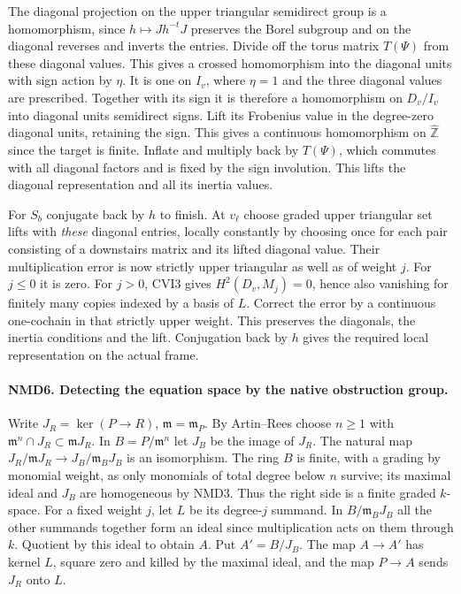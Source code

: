 The diagonal projection on the upper triangular semidirect group
is a homomorphism, since $h\mapsto Jh^{-t}J$ preserves the Borel
subgroup and on the diagonal reverses and inverts the entries.
Divide off the torus matrix $T(\Psi)$ from these diagonal values.
This gives a crossed homomorphism into the diagonal units with
sign action by $\eta$. It is one on $I_v$, where $\eta=1$ and the
three diagonal values are prescribed. Together with its sign it
is therefore a homomorphism on $D_v/I_v$ into diagonal units
semidirect signs. Lift its Frobenius value in the degree-zero
diagonal units, retaining the sign. This gives a continuous
homomorphism on $\widehat{\mathbb Z}$ since the target is finite.
Inflate and multiply back by $T(\Psi)$, which commutes with all
diagonal factors and is fixed by the sign involution. This lifts
the diagonal representation and all its inertia values.

For $S_b$ conjugate back by $h$ to finish. At $v_\ell$ choose
graded upper triangular set lifts with \emph{these} diagonal entries,
locally constantly by choosing once for each pair consisting of
a downstairs matrix and its lifted diagonal value. Their
multiplication error is now strictly upper triangular as well as
of weight $j$. For $j\le0$ it is zero. For $j>0$, CVI3 gives
$H^2(D_v,M_j)=0$, hence also vanishing for finitely many copies
indexed by a basis of $L$. Correct the error by a continuous
one-cochain in that strictly upper weight. This preserves the
diagonals, the inertia conditions and the lift. Conjugation back
by $h$ gives the required local representation on the actual frame.

\paragraph{NMD6. Detecting the equation space by the native obstruction group.}
\label{claim:NMD6}
Write $J_R=\ker(P\to R)$, $\mathfrak m=\mathfrak m_P$. By
Artin--Rees choose $n\ge1$ with $\mathfrak m^n\cap J_R\subset
\mathfrak mJ_R$. In $B=P/\mathfrak m^n$ let $J_B$ be the
image of $J_R$. The natural map
$J_R/\mathfrak mJ_R\to J_B/\mathfrak m_B J_B$ is an isomorphism.
The ring $B$ is finite, with a grading by monomial weight, as only
monomials of total degree below $n$ survive; its maximal ideal and
$J_B$ are homogeneous by NMD3. Thus the right side is a finite
graded $k$-space. For a fixed weight $j$, let $L$ be its degree-$j$
summand. In $B/\mathfrak m_BJ_B$ all the other summands together
form an ideal since multiplication acts on them through $k$.
Quotient by this ideal to obtain $A$. Put $A'=B/J_B$. The map
$A\to A'$ has kernel $L$, square zero and killed by the maximal
ideal, and the map $P\to A$ sends $J_R$ onto $L$.

